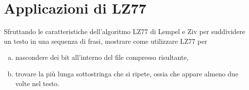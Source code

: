 \chapter{Applicazioni di LZ77}

\begin{problem*}
  Sfruttando le caratteristiche dell'algoritmo LZ77 di Lempel e Ziv per
  suddividere un testo in una sequenza di frasi, mostrare come utilizzare
  LZ77 per 
  \begin{enumerate}[(a)]
    \item nascondere dei bit all'interno del file compresso risultante,
    \item trovare la pi\`u lunga sottostringa che si ripete, ossia che appare almeno due volte nel testo.
  \end{enumerate}
\end{problem*}

